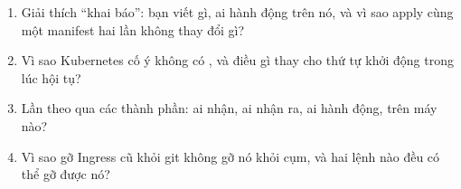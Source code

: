 \begin{quiz}
\begin{enumerate}
  \item Giải thích ``khai báo'': bạn viết gì, ai hành động trên nó, và
  vì sao apply cùng một manifest hai lần không thay đổi gì?
  \item Vì sao Kubernetes cố ý không có , và điều gì
  thay cho thứ tự khởi động trong lúc hội tụ?
  \item Lần theo  qua các thành
  phần: ai nhận, ai nhận ra, ai hành động, trên máy nào?
  \item Vì sao gỡ Ingress cũ khỏi git không gỡ nó khỏi cụm, và hai lệnh
  nào đều có thể gỡ được nó?
\end{enumerate}
\end{quiz}
